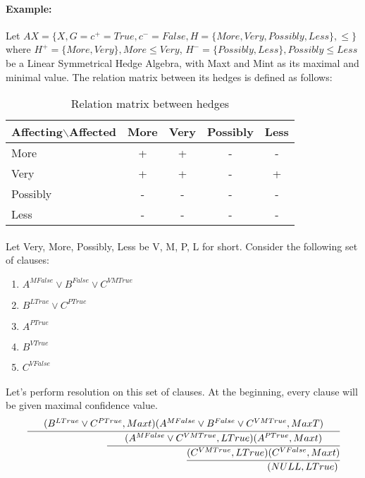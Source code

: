 \documentclass[part1.tex]{subfiles}
\begin{document}
\paragraph{Example: }
Let $AX = \{X, G = {c^{+} = True, c^{-} =
False}, H = \{More, Very, Possibly, Less\}, \le\}$ \\ where
$H^{+} =
\{More, Very\}, More \le Very$, $H^{-} = \{Possibly, Less\},
Possibly \le Less$ be a Linear Symmetrical Hedge Algebra, with
Maxt and Mint as its maximal and minimal value. The relation matrix between its hedges is
defined as follows:
\begin{table}[H]
   \centering
    \begin{tabular}{|l|c|c|c|c|}
      \hline
                  Affecting$\backslash$Affected & More & Very &
      Possibly & Less \\ \hline
                  More                        & +    & +    & -
      & -    \\ \hline
                  Very                        & +    & +    & -
      & +    \\ \hline
                  Possibly                    & -    & -    & -
      & -    \\ \hline
                  Less                        & -    & -    & -
      & -    \\ \hline
    \end{tabular}
    \caption {Relation matrix between hedges}
\end{table}
\paragraph{} Let Very, More, Possibly, Less be V, M, P, L for
short. Consider the following set of clauses:\\
\begin{enumerate}
  \item $A^{MFalse} \vee B^{False} \vee C^{VMTrue}$
  \item $B^{LTrue} \vee C^{PTrue}$
  \item $A^{PTrue}$
  \item $B^{VTrue}$
  \item $C^{VFalse}$
\end{enumerate}
\paragraph{} Let's perform resolution on this set of clauses. At
the beginning, every clause will be given maximal confidence
value.
\[
  \cfrac{ (B^{LTrue} \vee C^{PTrue},Maxt) (A^{MFalse} \vee B^{False} \vee
  C^{VMTrue}, MaxT)}
  {\qquad\qquad\qquad\qquad \cfrac{ (A^{MFalse} \vee C^{VMTrue}, LTrue) (A^{PTrue}, Maxt)}
    {\qquad\qquad\qquad\qquad \cfrac {(C^{VMTrue}, LTrue) (C^{VFalse}, Maxt)}
      {\qquad\qquad\qquad\qquad (NULL, LTrue)
        }
     }
    }
\]
\end{document}
